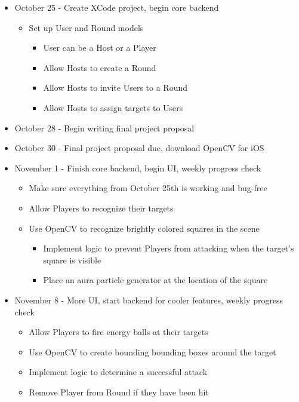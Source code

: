 \documentclass{article}
\begin{document}
\begin{itemize}
  \item October 25 - Create XCode project, begin core backend 
    \begin{itemize}
      \item Set up User and Round models
      \begin{itemize}
        \item User can be a Host or a Player
        \item Allow Hosts to create a Round
        \item Allow Hosts to invite Users to a Round 
        \item Allow Hosts to assign targets to Users
      \end{itemize}
    \end{itemize}
  \item October 28 - Begin writing final project proposal
  \item October 30 - Final project proposal due, download OpenCV for iOS
  \item November 1 - Finish core backend, begin UI, weekly progress check
    \begin{itemize}
      \item Make sure everything from October 25th is working and bug-free
      \item Allow Players to recognize their targets 
      \item Use OpenCV to recognize brightly colored squares in the scene
      \begin{itemize}
        \item Implement logic to prevent Players from attacking when the
          target's square is visible
        \item Place an aura particle generator at the location of the square
      \end{itemize}
    \end{itemize}
  \item November 8 - More UI, start backend for cooler features, weekly progress check 
    \begin{itemize}
      \item Allow Players to fire energy balls at their targets 
      \item Use OpenCV to create bounding bounding boxes around the target
      \item Implement logic to determine a successful attack
      \item Remove Player from Round if they have been hit
    \end{itemize}

\end{itemize}
\end{document}
